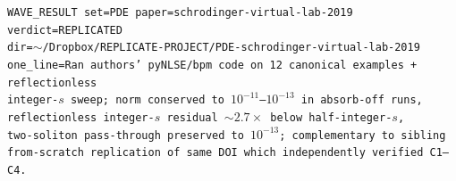 \documentclass[11pt,a4paper]{article}
\begin{document}
\vspace{1em}
\noindent
\texttt{WAVE\_RESULT set=PDE paper=schrodinger-virtual-lab-2019 verdict=REPLICATED\\
dir=$\sim$/Dropbox/REPLICATE-PROJECT/PDE-schrodinger-virtual-lab-2019\\
one\_line=Ran authors' pyNLSE/bpm code on 12 canonical examples + reflectionless\\
integer-$s$ sweep; norm conserved to $10^{-11}$--$10^{-13}$ in absorb-off runs,\\
reflectionless integer-$s$ residual $\sim 2.7\times$ below half-integer-$s$,\\
two-soliton pass-through preserved to $10^{-13}$; complementary to sibling\\
from-scratch replication of same DOI which independently verified C1--C4.}
\end{document}

